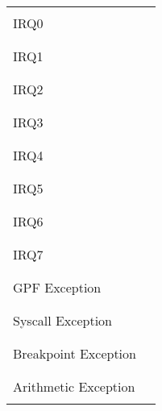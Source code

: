 \documentclass[a4paper,10pt]{article}
\begin{document}
\begin{enumerate}
\begin{tabular}{p{4cm}|p{3cm}|}
\cline{2-2}
&  \\
IRQ0 & \\ & \\
\cline{2-2}
&  \\
IRQ1 & \\ & \\
\cline{2-2}
&  \\
IRQ2 & \\ & \\
\cline{2-2}
&  \\
IRQ3 & \\ & \\
\cline{2-2}
&  \\
IRQ4 & \\ & \\ 
\cline{2-2}
&  \\
IRQ5 & \\ & \\
\cline{2-2}
&  \\
IRQ6 & \\ & \\
\cline{2-2}
&  \\
IRQ7 & \\ & \\
\cline{2-2}
&  \\
GPF Exception & \\ & \\
\cline{2-2}
&  \\
Syscall Exception & \\ & \\
\cline{2-2}
&  \\
Breakpoint Exception & \\ & \\
\cline{2-2}
&  \\
Arithmetic Exception & \\ & \\
\cline{2-2}\end{tabular}


\end{enumerate}
\end{document}
